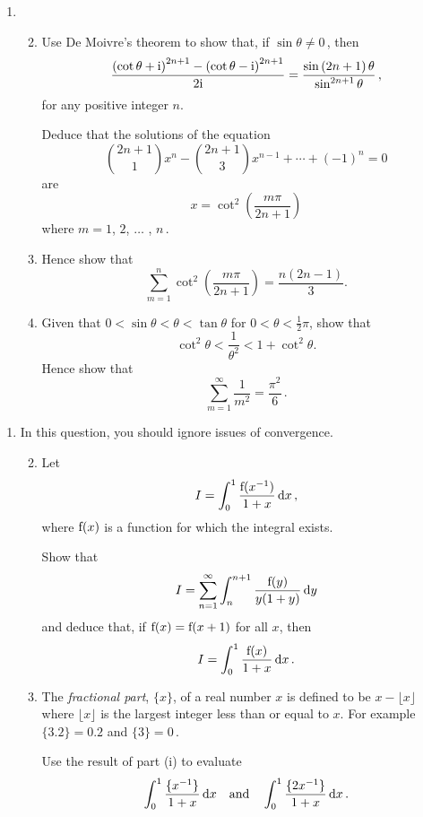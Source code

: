 \documentclass[a4, 11pt]{report}
\newlength{\qspace}
\newcounter{qnumber}
\newenvironment{question}%
 {\vspace{\qspace}
  \begin{enumerate}[\bfseries 1\quad][10]%
    \setcounter{enumi}{\value{qnumber}}%
    \item%
 }
{
  \end{enumerate}
  \filbreak
  \stepcounter{qnumber}
 }
\newenvironment{questionparts}[1][1]%
 {
  \begin{enumerate}[\bfseries (i)]%
    \setcounter{enumii}{#1}
    \addtocounter{enumii}{-1}
    \setlength{\itemsep}{3mm}
    \setlength{\parskip}{8pt}
 }
 {
  \end{enumerate}
 }
\def\d{{\rm d}}
\def\f{{\rm f}}
\begin{document}
\begin{question}
\begin{questionparts}
\item Use De Moivre's theorem to show that,
if $\sin\theta\ne0$\,, then
\[
\frac{
\left(\cot \theta + \rm{i}\right)^{2n+1}
-\left(\cot \theta - \rm{i}\right)^{2n+1}}{2\rm{i}}
=
\frac{\sin \left(2n+1\right)\theta}
{\sin^{2n+1}\theta}
\,,
\]
for any positive integer $n$.

Deduce that the solutions of the equation
\[
\binom{2n+1}{1}x^{n}-\binom{2n+1}{3}x^{n-1}
+\cdots +
\left(-1\right)^{n}=0
\] 
are
\[x=\cot^{2}\left(\frac{m\pi}{2n+1}\right)
\]
where $ m=1$, $2$, $\ldots$ , $n\,$.

\item
Hence show that 
\[
\sum_{m=1}^n
\cot^{2}\left(\frac{m\pi}{2n+1}\right)
=\frac{n\left(2n-1\right)}{3}.
\]

\item
Given that 
$0<\sin \theta <\theta <\tan \theta$ 
for 
$0 < \theta < \frac{1}{2}\pi$, 
show that 
\[
\cot^{2}\theta<\frac{1}{\theta^{2}}<1+\cot^{2}\theta.
\] 
Hence show that 
\[
\sum^\infty_{m=1}
\frac{1}{m^2}=
\frac{\pi^2}{6}\,.\]

\end{questionparts}
 

\end{question}



\begin{question}
In this question, you should ignore issues of convergence.


\begin{questionparts}
\item
Let 
\[
I = \int_0^1 \frac{\f(x^{-1}) } {1+x} \, \d x
\,,
\] 
where $\f(x)$ is a function for which the integral exists.

Show that 
\[
I = \sum_{n=1}^\infty \int_n^{n+1} \frac{\f(y) } {y(1+y)}\, \d y
\]
and deduce that, if $\f(x) = \f(x+1)$ for all $x$, then 
\[
I= \int_0^1 \frac{\f(x)}  {1+x} \, \d x
\,.
\]
\item
The {\em fractional part}, $\{x\}$, of a real number 
$x$ is defined to be $x-\lfloor x\rfloor$ where 
$\lfloor x \rfloor$ is 
the largest integer less than or equal to $x$.
For example $\{3.2\} = 0.2$ and $\{3\}=0\,$.

Use the result of part (i) to evaluate
\vspace{3mm}
\[
  \displaystyle \int _0^1 \frac { \{x^{-1}\}}{1+x}\, \d x \text{ \ \ and \ \ }
  \displaystyle \int _0^1 \frac { \{2x^{-1}\}}{1+x}\, \d x \,. 
\]
\end{questionparts}
\end{question}
\end{document}
